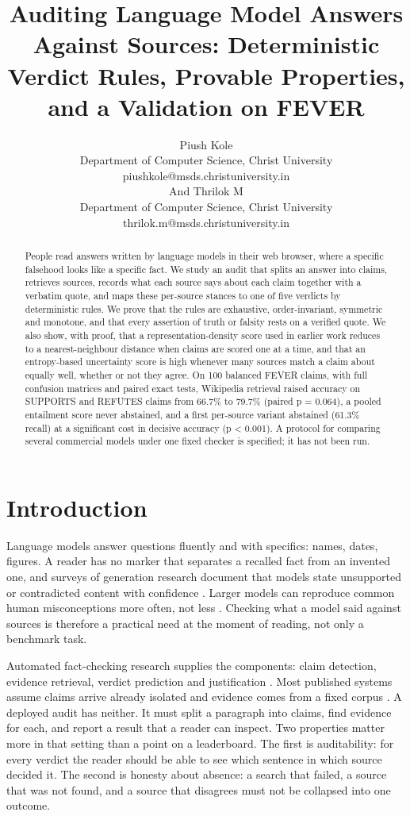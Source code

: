 \documentclass[11pt,a4paper]{article}
\title{Auditing Language Model Answers Against Sources: Deterministic Verdict Rules, Provable Properties, and a Validation on FEVER}
\author{Piush Kole \\ Department of Computer Science, Christ University \\ {piushkole@msds.christuniversity.in} \\And Thrilok M \\ Department of Computer Science, Christ University \\ {thrilok.m@msds.christuniversity.in}}
\date{}
\begin{document}
\maketitle
\begin{abstract}
People read answers written by language models in their web browser, where a specific falsehood looks like a specific fact. We study an audit that splits an answer into claims, retrieves sources, records what each source says about each claim together with a verbatim quote, and maps these per-source stances to one of five verdicts by deterministic rules. We prove that the rules are exhaustive, order-invariant, symmetric and monotone, and that every assertion of truth or falsity rests on a verified quote. We also show, with proof, that a representation-density score used in earlier work reduces to a nearest-neighbour distance when claims are scored one at a time, and that an entropy-based uncertainty score is high whenever many sources match a claim about equally well, whether or not they agree. On 100 balanced FEVER claims, with full confusion matrices and paired exact tests, Wikipedia retrieval raised accuracy on SUPPORTS and REFUTES claims from 66.7\% to 79.7\% (paired p = 0.064), a pooled entailment score never abstained, and a first per-source variant abstained (61.3\% recall) at a significant cost in decisive accuracy (p < 0.001). A protocol for comparing several commercial models under one fixed checker is specified; it has not been run.
\end{abstract}

\section{Introduction}

Language models answer questions fluently and with specifics: names, dates, figures. A reader has no marker that separates a recalled fact from an invented one, and surveys of generation research document that models state unsupported or contradicted content with confidence \citep{ji2023}. Larger models can reproduce common human misconceptions more often, not less \citep{lin2022}. Checking what a model said against sources is therefore a practical need at the moment of reading, not only a benchmark task.

Automated fact-checking research supplies the components: claim detection, evidence retrieval, verdict prediction and justification \citep{guo2022}. Most published systems assume claims arrive already isolated and evidence comes from a fixed corpus \citep{thorne2018}. A deployed audit has neither. It must split a paragraph into claims, find evidence for each, and report a result that a reader can inspect. Two properties matter more in that setting than a point on a leaderboard. The first is auditability: for every verdict the reader should be able to see which sentence in which source decided it. The second is honesty about absence: a search that failed, a source that was not found, and a source that disagrees must not be collapsed into one outcome.
\end{document}
